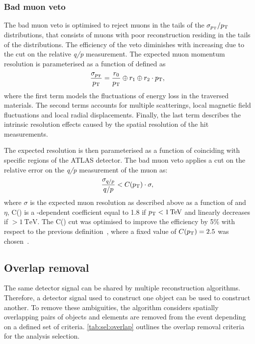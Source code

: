 \subsubsection{Bad muon veto}\label{sec:selmm:badmuon}
The bad muon veto is optimised to reject muons in the tails of the $\sigma_{p_{\text{T}}}/p_{\text{T}}$ distributions, that consists of muons with poor reconstruction residing in the tails of the \pt distributions. The efficiency of the veto diminishes with increasing \pt due to the cut on the relative \emph{q/p} measurement. The expected muon momentum resolution is parameterised as a function of \pt defined as~\cite{Aad:2016jkr}
\begin{equation}
   \frac{\sigma_{p_{\text{T}}}}{p_{\text{T}}} = \frac{r_0}{p_{\text{T}}} \oplus r_1 \oplus r_2 \cdot p_{\text{T}},
\end{equation}
where the first term models the fluctuations of energy loss in the traversed materials. The second terms accounts for multiple scatterings, local magnetic field fluctuations and local radial displacements. Finally, the last term describes the intrinsic resolution effects caused by the spatial resolution of the hit measurements. 

The expected resolution is then parameterised as a function of \pt coinciding with specific regions of the ATLAS detector. The bad muon veto applies a cut on the relative error on the \emph{q/p} measurement of the muon as: 
\begin{equation}
    \frac{\sigma_{q/p}}{q/p} < C(p_{\text{T}}) \cdot \sigma,
 \end{equation}
where $\sigma$ is the expected muon resolution as described above as a function of \pt and $\eta$, C(\pt) is a \pt-dependent coefficient equal to 1.8 if $\pt < \SI{1}{\tera\electronvolt}$ and linearly decreases if \pt $> \SI{1}{\tera\electronvolt}$. The C(\pt) cut was optimised to improve the efficiency by 5\% with respect to the previous definition~\cite{EXOT-2016-05}, where a fixed value of $C(p_{\text{T}}) = 2.5$ was chosen~\cite{Aad:2019fac}. 

\subsection{Overlap removal}
The same detector signal can be shared by multiple reconstruction algorithms. Therefore, a detector signal used to construct one object can be used to construct another. To remove these ambiguities, the algorithm considers spatially overlapping pairs of objects and elements are removed from the event depending on a defined set of criteria. \cref{tab:sel:overlap} outlines the overlap removal criteria for the analysis selection. 


